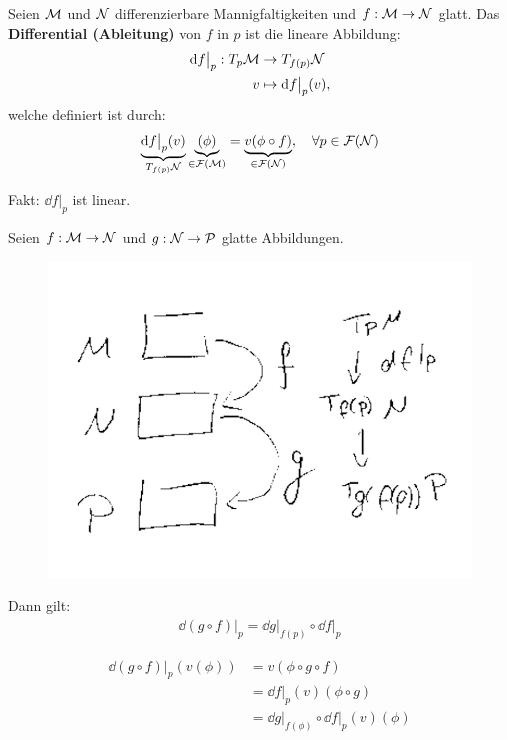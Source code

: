 \begin{defs}
Seien $\mathcal{M}$ und $\mathcal{N}$ differenzierbare Mannigfaltigkeiten und $f: \mathcal{M} \to \mathcal{N}$ glatt.
Das \textbf{Differential (Ableitung)} von $f$ in $p$ ist die lineare Abbildung:
\begin{align}
\dd f \big\vert_p : T_{p} \mathcal{M} &\to T_{f(p)}\mathcal{N} \\
v &\mapsto \dd f \big\vert_p (v),
\end{align}
welche definiert ist durch:
\begin{align}
\underbrace{\dd f \big\vert_p (v)}_{T_{f(p)}\mathcal{N}} \underbrace{(\phi)}_{\in \mathcal{F}(\mathcal{M})} = \underbrace{v(\phi \circ f)}_{\in \mathcal{F}(\mathcal{N})}, \quad \forall p \in \mathcal{F}(\mathcal{N})
\end{align}
\end{defs}
Fakt: $\dd f \big\vert_p$ ist linear.

\begin{satz}[Kettenregel]
\label{satz:Kettenregel}
Seien $f: \mathcal{M} \to \mathcal{N}$ und $g: \mathcal{N} \to \mathcal{P}$ glatte Abbildungen.
\begin{figure}[h]
\centering
\includegraphics[width=0.5\linewidth]{figures/scan/kettenregel.png}
\label{img:kettenregel}
\end{figure} 
Dann gilt:
\begin{align}
\dd (g \circ f) \big\vert_p = \dd g \big\vert_{f(p)} \circ \dd f \big\vert_p
\end{align}
\end{satz}

\begin{bew} \leavevmode
\begin{align}
\dd (g \circ f) \big\vert_{p} (v (\phi)) &= v(\phi \circ g \circ f) \\
&= \dd f \big\vert_p (v)(\phi \circ g) \\
&= \dd g \big\vert_{f(\phi)} \circ \dd f \big\vert_p (v) (\phi)
\end{align}
\end{bew}

